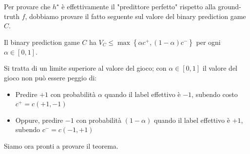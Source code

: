 Per provare che $h^\star$ è effettivamente il "predittore perfetto"  rispetto alla ground-truth $f$, dobbiamo provare il fatto seguente sul valore del binary prediction game $C$. \\

\begin{fact}
    \label{fact:boost1}
    Il binary prediction game $C$ ha $V_C \leq \max \left\{\alpha c^+, (1 - \alpha)c^-\right\}$ per ogni $\alpha \in [0,1]$.
\end{fact}

Si tratta di un limite superiore al valore del gioco; con $\alpha \in [0,1]$ il valore del gioco non può essere peggio di:
\begin{itemize}
    \item Predire $+1$ con probabilità $\alpha$ quando il label effettivo è $-1$, subendo costo $c^+ = c(+1,-1)$

    \item Oppure, predire $-1$ con probabilità $(1 - \alpha)$ quando il label effettivo è $+1$, subendo $c^- = c (-1, +1)$
\end{itemize}

Siamo ora pronti a provare il teorema. \\

